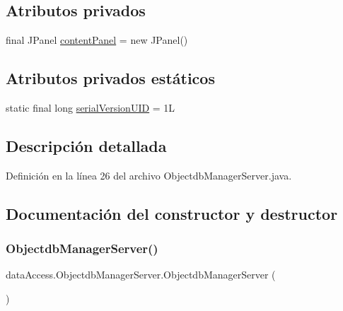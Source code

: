 \subsection*{Atributos privados}
\begin{DoxyCompactItemize}
\item 
final J\+Panel \mbox{\hyperlink{classdata_access_1_1_objectdb_manager_server_ad26f12e877ed4c593d4444ece4309e6c}{content\+Panel}} = new J\+Panel()
\end{DoxyCompactItemize}
\subsection*{Atributos privados estáticos}
\begin{DoxyCompactItemize}
\item 
static final long \mbox{\hyperlink{classdata_access_1_1_objectdb_manager_server_aecacee957a38daebfb09c8b326497696}{serial\+Version\+U\+ID}} = 1L
\end{DoxyCompactItemize}


\subsection{Descripción detallada}


Definición en la línea 26 del archivo Objectdb\+Manager\+Server.\+java.



\subsection{Documentación del constructor y destructor}
\mbox{\label{classdata_access_1_1_objectdb_manager_server_a6aac62b0bbbebbb54d3105d5820c0061}} 
\subsubsection{\texorpdfstring{ObjectdbManagerServer()}{ObjectdbManagerServer()}}
{\footnotesize\ttfamily data\+Access.\+Objectdb\+Manager\+Server.\+Objectdb\+Manager\+Server (\begin{DoxyParamCaption}{ }\end{DoxyParamCaption})}



